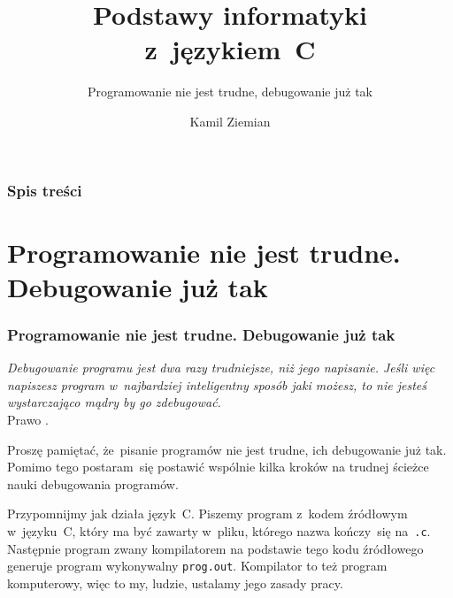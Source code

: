 \documentclass[10pt,t]{beamer}
\title{Podstawy informatyki z~językiem~C}
\subtitle{Programowanie nie jest trudne, debugowanie już tak}
\author{Kamil Ziemian \\
  \email}
\begin{document}





\RaggedRight





\maketitle





\begin{frame}
  \frametitle{Spis treści}


  \tableofcontents

\end{frame}










\section{Programowanie nie jest trudne. Debugowanie już tak}


\begin{frame}
  \frametitle{Programowanie nie jest trudne. Debugowanie już
    tak}


  \textit{Debugowanie programu jest dwa razy trudniejsze, niż jego
    napisanie. Jeśli więc napiszesz program w~najbardziej inteligentny
    sposób jaki możesz, to nie jesteś wystarczająco mądry by go
    zdebugować.} \\
  Prawo
  .

  Proszę pamiętać, że~pisanie programów nie jest trudne, ich debugowanie już
  tak. Pomimo tego postaram~się postawić wspólnie kilka kroków na trudnej
  ścieżce nauki debugowania programów.

  Przypomnijmy jak działa język~C. Piszemy program z~kodem źródłowym
  w~języku~C, który ma być zawarty w~pliku, którego nazwa \alert{kończy~się
    na~\texttt{.c}}. Następnie program zwany kompilatorem na podstawie
  tego kodu źródłowego generuje program wykonywalny \texttt{prog.out}.
  Kompilator to też program komputerowy, więc to my, ludzie, ustalamy
  jego zasady pracy.

\end{frame}
\end{document}
